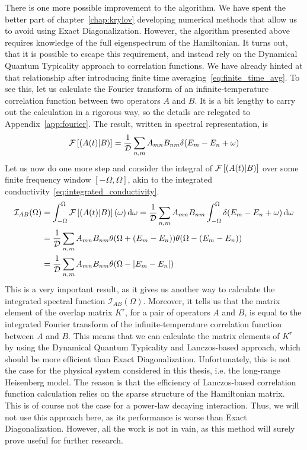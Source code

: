 There is one more possible improvement to the algorithm. We have spent the better part of chapter~\ref{chap:krylov}
developing numerical methods that allow us to avoid using Exact Diagonalization. However, the algorithm presented
above requires knowledge of the full eigenspectrum of the Hamiltonian. It turns out, that it is possible
to escape this requirement, and instead rely on the Dynamical Quantum Typicality approach to correlation functions.
We have already hinted at that relationship after introducing finite time averaging~\eqref{eq:finite_time_avg}.
To see this, let us calculate the Fourier transform of an infinite-temperature correlation function between
two operators \(A\) and \(B\). It is a bit lengthy to carry out the calculation in a rigorous way, so the
details are relegated to Appendix~\ref{app:fourier}. The result, written in spectral representation, is
\begin{equation}
  \mathcal{F}\left[\left(A(t) \middle| B\right)\right] = \frac{1}{\mathcal{D}}\sum_{n,m} A_{mn} B_{nm} \delta(E_m-E_n+\omega)
  \label{eq:fourier_corr}
\end{equation}
Let us now do one more step and consider the integral of \(\mathcal{F}\left[\left(A(t) \middle| B\right)\right]\) over
some finite frequency window \([-\Omega, \Omega]\), akin to the integrated conductivity~\eqref{eq:integrated_conductivity}.
\begin{align}
  \mathcal{I}_{AB}(\Omega) & = \int_{-\Omega}^{\Omega} \mathcal{F}\left[\left(A(t) \middle| B\right)\right](\omega) \dd{\omega } =
  \frac{1}{\mathcal{D}}\sum_{n,m} A_{mn} B_{nm} \int_{-\Omega}^{\Omega}
  \delta(E_m-E_n+\omega)\dd{\omega }  \nonumber                                                                    \\ &= \frac{1}{\mathcal{D}}\sum_{n,m} A_{mn} B_{nm}
  \theta(\Omega + (E_m-E_n))\theta(\Omega - (E_m-E_n)) \nonumber                                                   \\
                           & = \frac{1}{\mathcal{D}}\sum_{n,m} A_{mn} B_{nm}\theta(\Omega - \abs{E_m-E_n})
  \label{eq:integrated_spectral}
\end{align}
This is a very important result, as it gives us another way to calculate the integrated spectral function \(\mathcal{I}_{AB}(\Omega)\).
Moreover, it tells us that the matrix element of the overlap matrix \(K^{\tau}\),
for a pair of operators \(A\) and \(B\), is equal to the integrated Fourier transform of the infinite-temperature
correlation function between \(A\) and \(B\). This means that we can calculate the matrix elements of \(K^{\tau}\)
by using the Dynamical Quantum Typicality and Lanczos-based approach, which should be more efficient than Exact Diagonalization.
Unfortunately, this is not the case for the physical system considered in this thesis,
i.e. the long-range Heisenberg model. The reason is that the efficiency of Lanczos-based
correlation function calculation relies on the sparse structure of the Hamiltonian matrix.
This is of course not the case for a power-law decaying interaction. Thus, we will not use this approach
here, as its performance is worse than Exact Diagonalization. However, all the work is not in vain, as this method will surely prove useful
for further research.


